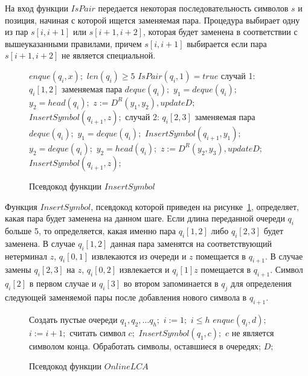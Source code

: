 \documentclass[12pt,a4paper]{extarticle}
\theoremstyle{break}
\begin{document}
На вход функции $IsPair$ передается некоторая последовательность символов $s$
и позиция, начиная с которой ищется заменяемая пара. Процедура выбирает одну из пар $s[i, i+1]$ или
$s[i+1, i+2]$, которая будет заменена в соответствии с вышеуказанными правилами, причем $s[i, i+1]$
выбирается если пара $s[i+1, i+2]$ не является специальной.

\begin{figure}[!h]
	\begin{center}
	  \begin{varwidth}{\linewidth}
		\begin{codebox}
				\li $enque(q_i,x);$
				\li \If $len(q_i) \geq 5$
				\li 	\Then
				\li		\If $IsPair(q_i, 1) = true$
				\li 		\Then 
				\li			\Comment случай 1: $q_i[1,2]$ заменяемая пара
				\li			$deque(q_i);$
				\li			$y_1 = deque(q_i);$
				\li			$y_2 = head(q_i);$
				\li			$z := D^R(y_1,y_2), update D;$
				\li			$InsertSymbol(q_{i+1}, z);$
				\li		\Else 
				\li			\Comment случай 2: $q_i[2,3]$ заменяемая пара	
				\li			$deque(q_i);$
				\li			$y_1 = deque(q_i);$
				\li			$InsertSymbol(q_{i+1}, y_1);$
				\li			$y_2 = deque(q_i);$	
				\li			$y_2 = head(q_i);$
				\li			$z := D^R(y_2,y_3), update D;$	
				\li			$InsertSymbol(q_{i+1}, z);$
				\End
				\End 
		\end{codebox}
		\caption{Псевдокод функции $InsertSymbol$}
		\label{insertsymbol}
	  \end{varwidth}
	\end{center}
\end{figure}

Функция $InsertSymbol$, псевдокод которой приведен на
рисунке~\ref{insertsymbol}, определяет, какая пара будет заменена на данном
шаге.
Если длина переданной очереди $q_i$ больше 5, то определяется, какая именно пара
$q_i[1,2]$ либо $q_i[2,3]$ будет заменена. В случае $q_i[1,2]$ данная пара заменятся на
соответствующий нетерминал $z$, $q_i[0,1]$ извлекаются из очереди и $z$
помещается в $q_{i+1}$. В случае замены $q_i[2,3]$ на $z$, $q_i[0,2]$
извлекается и $q_i[1]z$ помещается в $q_{i+1}$. Символ $q_i[2]$ в первом случае
и $q_i[3]$ во втором запоминается в $q_j$ для определения следующей заменяемой
пары после добавления нового символа в $q_{i+1}$.

\begin{figure}[!h]
	\begin{center}
	  \begin{varwidth}{\linewidth}
		\begin{codebox}
			\Procname{$\proc{Online LCA}$}
				\li Создать пустые очереди $q_1,q_2, \ldots q_h;$
				\li $i := 1;$
				\li \While $i \leq h$
				\li		\Do
				\li 	$enque(q_i,d);$
				\li 	$i := i + 1;$
				\End 
				\li \Repeat
				\li		считать символ $c;$
				\li		$InsertSymbol(q_1,c);$
				\li \Until $c$ не является символом конца.
				\li Обработать символы, оставшиеся в очередях;
				\li \Return $D;$
		\end{codebox}
		\caption{Псевдокод функции $Online LCA$}
		\label{onlinelca}
	  \end{varwidth}
	\end{center}
\end{figure}
\end{document}
